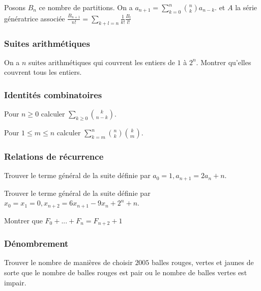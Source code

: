 \begin{sol}
Posons $B_n$ ce nombre de partitions. On a $a_{n+1} = \sum_{k=0}^n {n \choose k} a_{n - k}$. et $A$ la série génératrice associée
$\frac{B_{n+1}}{n!} = \sum_{k+l=n} \frac 1{k!}\frac{B_l}{l!}$
\end{sol}


\subsubsection{Suites arithmétiques}


\begin{exo}
On a $n$ suites arithmétiques qui couvrent les entiers de $1$ à $2^n$. Montrer qu'elles couvrent tous les entiers.
\end{exo}


\subsubsection{Identités combinatoires}


\begin{exo}
Pour $n\geq 0$ calculer $\sum_{k\geq 0}\binom{k}{n-k}$.
\end{exo}


\begin{exo}
Pour $1\leq m\leq n$ calculer $\sum_{k=m}^{n} \binom{n}{k}\binom{k}{m}$.
\end{exo}


\subsubsection{Relations de récurrence}


\begin{exo}
Trouver le terme général de la suite définie par $a_0=1, a_{n+1}=2a_n+n$.
\end{exo}


\begin{exo}
Trouver le terme général de la suite définie par $x_0=x_1=0, x_{n+2}=6x_{n+1}-9x_n+2^n+n$.
\end{exo}


\begin{exo}
Montrer que $F_0+...+F_n=F_{n+2}+1$
\end{exo}


\subsubsection{Dénombrement}


\begin{exo}
Trouver le nombre de manières de choisir $2005$ balles rouges, vertes et jaunes de sorte que le nombre de balles rouges est pair ou le nombre de balles vertes est impair.
\end{exo}



